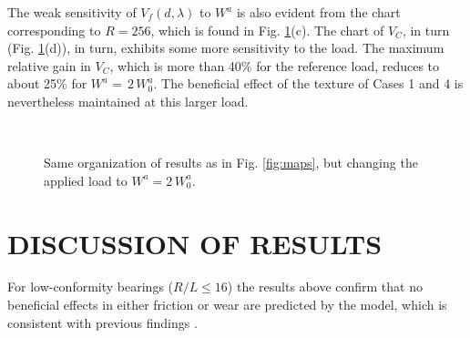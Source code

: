 The weak sensitivity of $V_f(d,\lambda)$ to $W^a$ is also
evident from the chart corresponding to $R=256$, which
is found in Fig. \ref{fig:maps-halfs}(c). The chart of $V_C$,
in turn (Fig. \ref{fig:maps-halfs}(d)), in turn, exhibits
some more sensitivity to the load. The maximum relative gain in
$V_C$, which is more than 40\% for the reference load, reduces
to about 25\% for $W^a=\,2\,W^a_0$. The beneficial effect of
the texture of Cases 1 and 4 is nevertheless maintained at
this larger load.










\begin{figure}[h]
     \begin{center}
	\subfigure[][]{\scalebox{0.65}{} \label{fig:R32f2c}}
	\subfigure[][]{\scalebox{0.65}{} \label{fig:R32C2c}} \\
	\subfigure[][]{\scalebox{0.65}{} \label{fig:R256f2c}}
	\subfigure[][]{\scalebox{0.65}{} \label{fig:R256C2c}}	
    \end{center}
\caption{Same organization of results as in Fig. \ref{fig:maps}, but changing the
applied load to $W^a = 2\,W^a_0$.
 }  
\label{fig:maps-halfs}
\end{figure}





\section{DISCUSSION OF RESULTS}


For low-conformity bearings ($R/L \leq 16$) the results above confirm
that no beneficial effects in either friction or wear are predicted
by the model, which is consistent with previous 
findings \cite{gad2012,checo13,etsion2013}.

